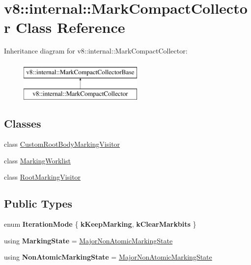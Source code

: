 \hypertarget{classv8_1_1internal_1_1MarkCompactCollector}{}\section{v8\+:\+:internal\+:\+:Mark\+Compact\+Collector Class Reference}
\label{classv8_1_1internal_1_1MarkCompactCollector}
Inheritance diagram for v8\+:\+:internal\+:\+:Mark\+Compact\+Collector\+:\begin{figure}[H]
\begin{center}
\leavevmode
\includegraphics[height=2.000000cm]{classv8_1_1internal_1_1MarkCompactCollector}
\end{center}
\end{figure}
\subsection*{Classes}
\begin{DoxyCompactItemize}
\item 
class \mbox{\hyperlink{classv8_1_1internal_1_1MarkCompactCollector_1_1CustomRootBodyMarkingVisitor}{Custom\+Root\+Body\+Marking\+Visitor}}
\item 
class \mbox{\hyperlink{classv8_1_1internal_1_1MarkCompactCollector_1_1MarkingWorklist}{Marking\+Worklist}}
\item 
class \mbox{\hyperlink{classv8_1_1internal_1_1MarkCompactCollector_1_1RootMarkingVisitor}{Root\+Marking\+Visitor}}
\end{DoxyCompactItemize}
\subsection*{Public Types}
\begin{DoxyCompactItemize}
\item 
\mbox{\label{classv8_1_1internal_1_1MarkCompactCollector_a73ad07045ed00233f92402a577f5361e}} 
enum {\bfseries Iteration\+Mode} \{ {\bfseries k\+Keep\+Marking}, 
{\bfseries k\+Clear\+Markbits}
 \}
\item 
\mbox{\label{classv8_1_1internal_1_1MarkCompactCollector_a45940352bf1cd815674d043829a82846}} 
using {\bfseries Marking\+State} = \mbox{\hyperlink{classv8_1_1internal_1_1MajorNonAtomicMarkingState}{Major\+Non\+Atomic\+Marking\+State}}
\item 
\mbox{\label{classv8_1_1internal_1_1MarkCompactCollector_a3006ec52836c22d76d860e1dd17fdf78}} 
using {\bfseries Non\+Atomic\+Marking\+State} = \mbox{\hyperlink{classv8_1_1internal_1_1MajorNonAtomicMarkingState}{Major\+Non\+Atomic\+Marking\+State}}
\end{DoxyCompactItemize}
